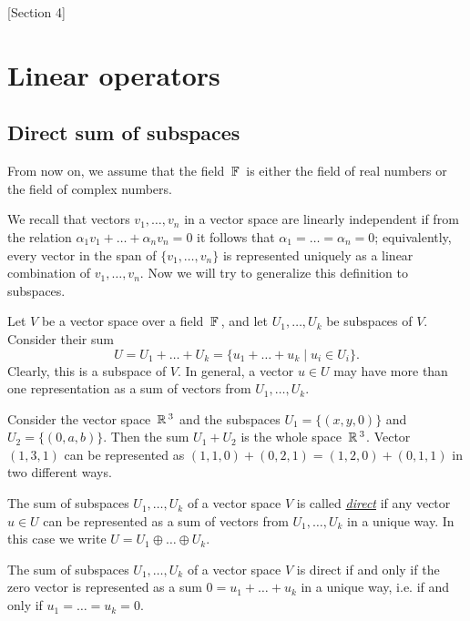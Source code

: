 [Section 4]

\newpage

\section{Linear operators}

\subsection{Direct sum of subspaces}

From now on, we assume that the field $\,\mathbb{F}\,$ is either the field of real numbers or the field of complex numbers.

We recall that vectors $v_1, \ldots, v_n$ in a vector space are linearly independent if from the relation $\alpha_1 v_1 + \dots + \alpha_n v_n = 0$ it follows that $\alpha_1 = \dots = \alpha_n = 0$; equivalently, every vector in the span of $\{v_1, \ldots, v_n\}$ is represented uniquely as a linear combination of $v_1, \ldots, v_n$. Now we will try to generalize this definition to subspaces.

Let $V$ be a vector space over a field $\,\mathbb{F}\,$, and let $U_1, \ldots, U_k$ be subspaces of $V$. Consider their sum
$$
U = U_1 + \dots + U_k = \{u_1 + \dots + u_k \mid u_i \in U_i\}.
$$
Clearly, this is a subspace of $V$. In general, a vector $u \in U$ may have more than one representation as a sum of vectors from $U_1, \ldots, U_k$.

\begin{example}
    Consider the vector space $\,\mathbb{R}\,^3$ and the subspaces $U_1 = \{(x, y, 0)\}$ and $U_2 = \{(0, a, b)\}$. Then the sum $U_1 + U_2$ is the whole space $\,\mathbb{R}\,^3$. Vector $(1, 3, 1)$ can be represented as $(1, 1, 0) + (0, 2, 1) = (1, 2, 0) + (0, 1, 1)$ in two different ways.
\end{example}

\begin{definition}
    The sum of subspaces $U_1, \ldots, U_k$ of a vector space $V$ is called \underline{\it direct} if any vector $u \in U$ can be represented as a sum of vectors from $U_1, \ldots, U_k$ in a unique way. In this case we write $U = U_1 \oplus \dots \oplus U_k$.
\end{definition}

\begin{lemma}
    The sum of subspaces $U_1, \ldots, U_k$ of a vector space $V$ is direct if and only if the zero vector is represented as a sum $0 = u_1 + \dots + u_k$ in a unique way, i.e. if and only if $u_1 = \dots = u_k = 0$.
\end{lemma}

